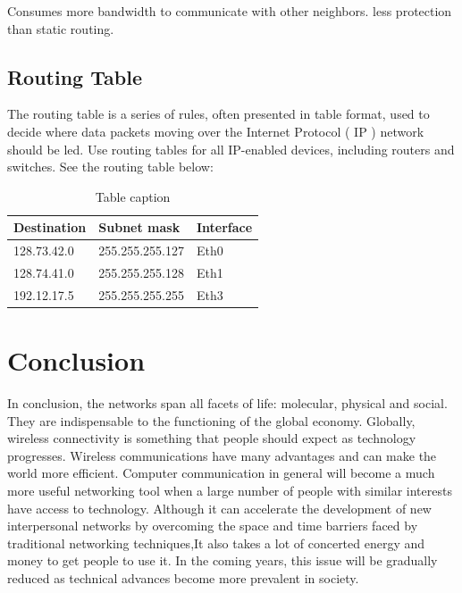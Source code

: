\documentclass[12pt]{article}
\begin{document}
Consumes more bandwidth to communicate with other neighbors. 
less protection than static routing.
\subsection{Routing Table}
The routing table is a series of rules, often presented in table format, used to decide where data packets moving over the Internet Protocol ( IP ) network should be led. Use routing tables for all IP-enabled devices, including routers and switches. See the routing table below:
\begin{table}[h]
\centering
\begin{tabular}{l l l}
\hline
\textbf{Destination} & \textbf{Subnet mask} & \textbf{Interface}\\
\hline
128.73.42.0   &   255.255.255.127   &    Eth0 \\
128.74.41.0   &   255.255.255.128  &    Eth1 \\
192.12.17.5   &   255.255.255.255   &   Eth3 \\
\hline
\end{tabular}
\caption{Table caption}
\end{table} \cite{3}

\section{Conclusion}
In conclusion, the networks span all facets of life: molecular, physical and social. They are indispensable to the functioning of the global economy. Globally, wireless connectivity is something that people should expect as technology progresses. Wireless communications have many advantages and can make the world more efficient. Computer communication in general will become a much more useful networking tool when a large number of people with similar interests have access to technology. Although it can accelerate the development of new interpersonal networks by overcoming the space and time barriers faced by traditional networking techniques,It also takes a lot of concerted energy and money to get people to use it. In the coming years, this issue will be gradually reduced as technical advances become more prevalent in society.
\end{document}
